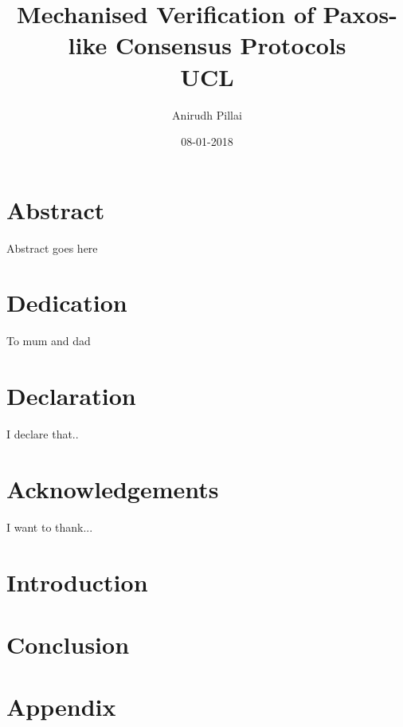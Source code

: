 \documentclass[12pt]{report}
\title{
	{Mechanised Verification of Paxos-like Consensus Protocols}\\
	{\large UCL}\\
}
\author{Anirudh Pillai}
\date{08-01-2018}
\begin{document}
\maketitle


\chapter*{Abstract}
Abstract goes here

\chapter*{Dedication}
To mum and dad

\chapter*{Declaration}
I declare that..

\chapter*{Acknowledgements}
I want to thank...

\tableofcontents


\chapter{Introduction}


\chapter{Conclusion}


\appendix
\chapter{Appendix}

\end{document}
